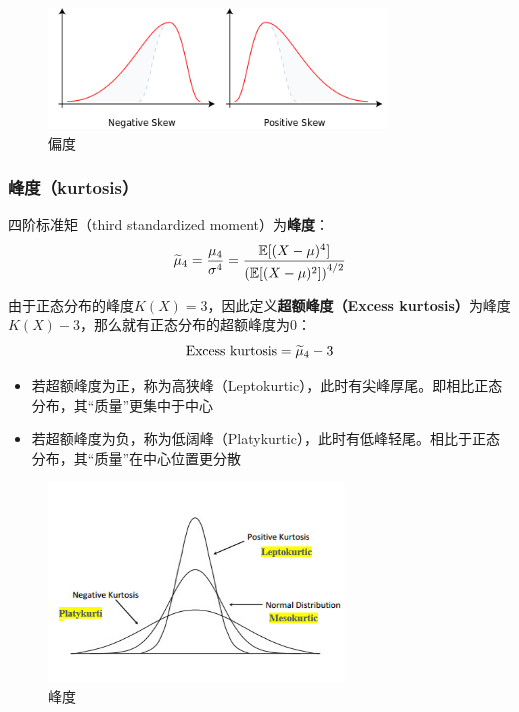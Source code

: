\documentclass[11pt]{article}
\begin{document}
\begin{figure}[H]
    \centering
    \includegraphics[width=0.8\textwidth]{fig/skewness.png}
    \caption{偏度}
    \label{fig:skew}
\end{figure}

\subsubsection*{峰度（kurtosis）}
四阶标准矩（third standardized moment）为\textbf{峰度}：
\begin{equation*}
    \widetilde{\mu}_4 = \frac{\mu_4}{\sigma^4} = \frac{\mathbb{E}[(X-\mu)^4]}{\left(\mathbb{E}[(X-\mu)^2]\right)^{4/2}} 
\end{equation*}

由于正态分布的峰度$K(X)=3$，因此定义\textbf{超额峰度（Excess kurtosis）}为峰度$K(X)-3$，那么就有正态分布的超额峰度为$0$：
\begin{equation*}
    \text{Excess kurtosis} = \widetilde{\mu}_4-3
\end{equation*}
\begin{itemize}
    \item 若超额峰度为正，称为高狭峰（Leptokurtic），此时有尖峰厚尾。即相比正态分布，其“质量”更集中于中心
    \item 若超额峰度为负，称为低阔峰（Platykurtic），此时有低峰轻尾。相比于正态分布，其“质量”在中心位置更分散
\end{itemize}

\begin{figure}[H]
    \centering
    \includegraphics[width=0.7\textwidth]{fig/kurtosis.png}
    \caption{峰度}
    \label{fig:kurt}
\end{figure}
\end{document}
